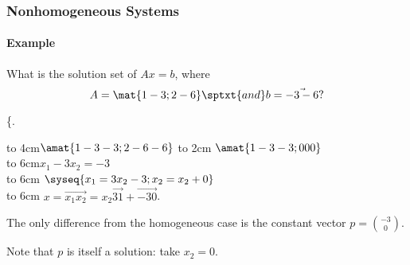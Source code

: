 \begin{frame}
\frametitle{Nonhomogeneous Systems}
\framesubtitle{Example}

\vskip-3mm
\begin{ques}
  What is the solution set of $Ax=b$, where
  \[ A = \mat{1 -3; 2 -6} \sptxt{and} b = \vec{-3 -6}? \]
\end{ques}

\spalignsysdelims\{.
\begin{webonly}
\leavevmode
\hbox to 4cm{\hfil$\amat{1 -3 -3; 2 -6 -6}$}%
\hbox to 2cm{\hfil{}}
\quad$\amat{1 -3 -3; 0 0 0}$\\[1mm]
\leavevmode
\hbox to 6cm{\hfil\longsquiggly[equation]}\quad $x_1 - 3x_2= -3$\\[2mm]
\leavevmode
\hbox to 6cm{\hfil{}}\quad 
$\syseq{x_1 = 3x_2 - 3; x_2 = x_2 + 0}$\\[1mm]
\leavevmode
\hbox to 6cm{\hfil{}}\quad 
$x = \vec{x_1 x_2} = x_2\vec{3 1} + \vec{-3 0}$.
\end{webonly}

\pause\medskip
The only difference from the homogeneous case is the constant vector $p =
{-3\choose 0}$.

\pause\medskip
Note that $p$ is itself a solution: take $x_2=0$.

\end{frame}



